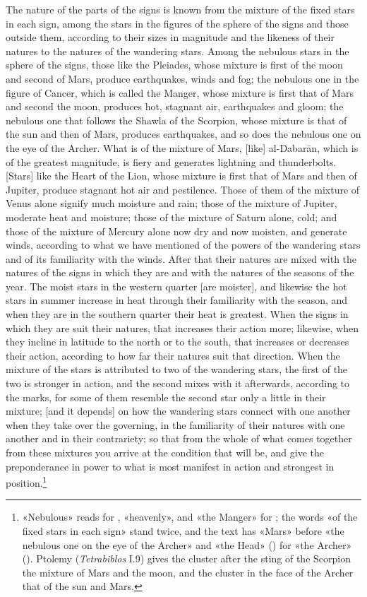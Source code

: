 \documentclass[11pt]{article}
\newcommand{\Fol}[1]{\marginpar{\footnotesize\color{gray}f.\,#1}}
\begin{document}
\par \Fol{32v}The nature of the parts of the signs is known from the mixture of the fixed stars in each sign, among the stars in the figures of the sphere of the signs and those outside them, according to their sizes in magnitude and the likeness of their natures to the natures of the wandering stars. Among the nebulous stars in the sphere of the signs, those like the Pleiades, whose mixture is first of the moon and second of Mars, produce earthquakes, winds and fog; the nebulous one in the figure of Cancer, which is called the Manger, whose mixture is first that of Mars and second the moon, produces hot, stagnant air, earthquakes and gloom; the nebulous one that follows the Shawla of the Scorpion, whose mixture is that of the sun and then of Mars, produces earthquakes, and so does the nebulous one on the eye of the Archer. What is of the mixture of Mars, [like] al-Dabarān, which is of the greatest magnitude, is fiery and generates lightning and thunderbolts. [Stars] like the Heart of the Lion, whose mixture is first that of Mars and then of Jupiter, produce stagnant hot air and pestilence. Those of them of the mixture of Venus alone signify much moisture and rain; those of the mixture of Jupiter, moderate heat and moisture; those of the mixture of Saturn alone, cold; and those of the mixture of Mercury alone now dry and now moisten, and generate winds, according to what we have mentioned of the powers of the wandering stars and of its familiarity with the winds. After that their natures are mixed with the natures of the signs in which they are and with the natures of the seasons of the year. The moist stars in the western quarter [are moister], and likewise the hot stars in summer increase in heat through their familiarity with the season, and when they are in the southern quarter their heat is greatest. When the signs in which they are suit their natures, that increases their action more; likewise, when they incline in latitude to the north or to the south, that increases or decreases their action, according to how far their natures suit that direction. When the mixture of the stars is attributed to two of the wandering stars, the first of the two is stronger in action, and the second mixes with it afterwards, according to the marks, for some of them resemble the second star only a little in their mixture; [and it depends] on how the wandering stars connect with one another when they take over the governing, in the familiarity of their natures with one another and in their contrariety; so that from the whole of what comes together from these mixtures you arrive at the condition that will be, and give the preponderance in power to what is most manifest in action and strongest in position.\footnote{«Nebulous» reads  for , «heavenly», and «the Manger»  for ; the words «of the fixed stars in each sign» stand twice, and the text has «Mars» before «the nebulous one on the eye of the Archer» and «the Head» () for «the Archer» (). Ptolemy (\emph{Tetrabiblos} I.9) gives the cluster after the sting of the Scorpion the mixture of Mars and the moon, and the cluster in the face of the Archer that of the sun and Mars.}\par
\end{document}
